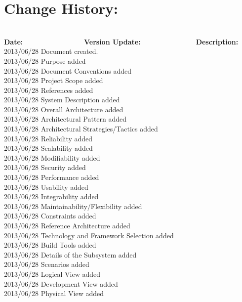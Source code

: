 \documentclass[29pt,a4paper]{moderncv}
\begin{document}
\section{\textbf{Change History:}}
\begin{tabbing}
\\\textbf{Date:} ~~~~~~~~~~~~~~~~~\= \textbf{Version Update:}~~~~~~~~~~~~~~~~\= \textbf{Description:}\\
2013/06/28 \> Document created.\\
2013/06/28  \> Purpose added\\
2013/06/28  \> Document Conventions added\\
2013/06/28  \> Project Scope added\\
2013/06/28  \> References added\\
2013/06/28  \> System Description added \\
2013/06/28  \> Overall Architecture added\\
2013/06/28  \> Architectural Pattern added\\	
2013/06/28  \> Architectural Strategies/Tactics added\\
2013/06/28  \> Reliability added\\
2013/06/28  \> Scalability added\\
2013/06/28  \> Modifiability added\\
2013/06/28  \> Security added\\
2013/06/28  \> Performance added\\
2013/06/28  \> Usability added\\
2013/06/28  \> Integrability added\\
2013/06/28  \> Maintainability/Flexibility added\\
2013/06/28  \> Constraints added\\
2013/06/28  \> Reference Architecture added\\
2013/06/28  \> Technology and Framework Selection added\\
2013/06/28  \> Build Tools added\\
2013/06/28  \> Details of the Subsystem added\\
2013/06/28  \> Scenarios added\\
2013/06/28  \> Logical View added\\
2013/06/28  \> Development View added\\
2013/06/28  \> Physical View added\\

\end{tabbing}
\end{document}
